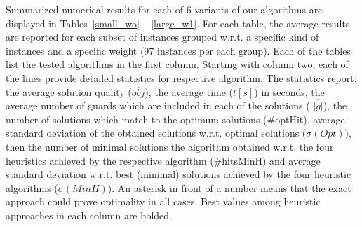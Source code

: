 \documentclass[runningheads,a4paper]{elsarticle}
\begin{document}
         Summarized numerical results for each of 6 variants of our algorithms are displayed
         in Tables~\ref{small_wo} -- \ref{large_w1}. For each table, the average results are reported for each subset of instances grouped w.r.t. a specific kind of instances and a specific weight (97 instances per each group). Each of the tables list the tested algorithms in the first column. Starting with column two,  each of the lines provide detailed statistics for respective algorithm.  The statistics report: the average solution quality ($\overline{obj}$), the average time ($\overline{t}[s]$) in seconds, the average number of guards which are included in each of the solutions ( $\overline{|g|}$), the number of solutions which match to the optimum solutions (\#optHit), average standard deviation of the obtained solutions w.r.t. optimal solutions ($\sigma(Opt)$), then the number of minimal solutions the algorithm obtained w.r.t. the four heuristics achieved by the respective algorithm (\#hitsMinH) and average standard deviation w.r.t. best (minimal) solutions achieved by the four heuristic algorithms   ($\sigma(MinH)$).  An asterisk in front of a number means that the exact approach  could prove optimality in all cases. Best values among heuristic approaches in each column are bolded.


     \begin{table}[]
     	\centering
        \caption{The results on the benchmark set $MinArea$ for the type of weight $W0$.}\label{small_wo}
     \end{table}
\end{document}
